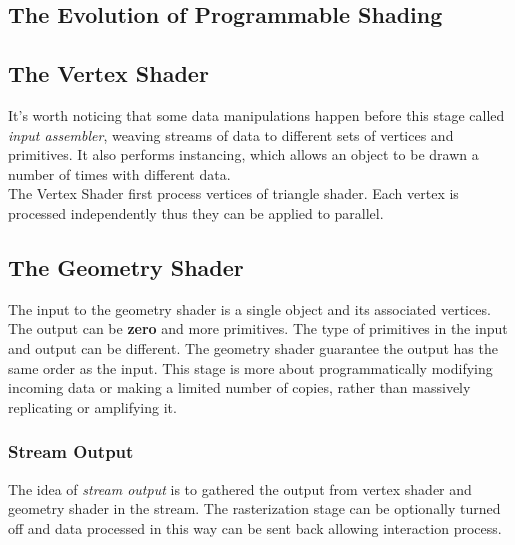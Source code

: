 \documentclass[10pt, a4paper]{article}
\begin{document}
        \subsection{The Evolution of Programmable Shading}
        
        \newpage

        \subsection{The Vertex Shader}
             It's worth noticing that some data manipulations happen before this stage called \emph{input assembler}, weaving streams of data to different sets of vertices and primitives. It also performs instancing, which allows an object to be drawn a number of times with different data. \\
             \indent The Vertex Shader first process vertices of triangle shader. Each vertex is processed independently thus they can be applied to parallel.
       
        \subsection{The Geometry Shader} 
            The input to the geometry shader is a single object and its associated vertices. The output can be \textbf{zero} and more primitives. The type of primitives in the input and output can be different. The geometry shader guarantee the output has the same order as the input. This stage is more about programmatically modifying incoming data or making a limited number of copies, rather than massively replicating or amplifying it.

            \subsubsection{Stream Output}
                The idea of \emph{stream output} is to gathered the output from vertex shader and geometry shader in the stream. The rasterization stage can be optionally turned off and data processed in this way can be sent back allowing interaction process. 
        
\end{document}
